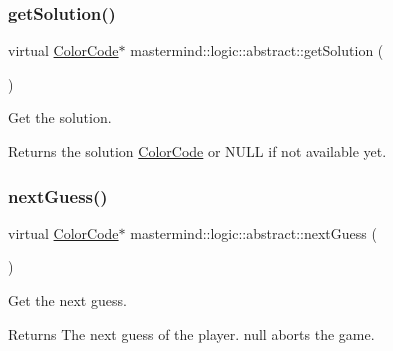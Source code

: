 \subsubsection{\texorpdfstring{get\+Solution()}{getSolution()}}
{\footnotesize\ttfamily virtual \hyperlink{classmastermind_1_1logic_1_1_color_code}{Color\+Code}$\ast$ mastermind\+::logic\+::abstract\+::get\+Solution (\begin{DoxyParamCaption}{ }\end{DoxyParamCaption})\hspace{0.3cm}{\ttfamily [pure virtual]}}



Get the solution. 

\begin{DoxyReturn}{Returns}
the solution \hyperlink{classmastermind_1_1logic_1_1_color_code}{Color\+Code} or N\+U\+LL if not available yet. 
\end{DoxyReturn}
\hypertarget{classmastermind_1_1logic_1_1abstract_ae4e30322061ea0ebc302274c79c5ca47}{}\label{classmastermind_1_1logic_1_1abstract_ae4e30322061ea0ebc302274c79c5ca47} 
\subsubsection{\texorpdfstring{next\+Guess()}{nextGuess()}}
{\footnotesize\ttfamily virtual \hyperlink{classmastermind_1_1logic_1_1_color_code}{Color\+Code}$\ast$ mastermind\+::logic\+::abstract\+::next\+Guess (\begin{DoxyParamCaption}{ }\end{DoxyParamCaption})\hspace{0.3cm}{\ttfamily [pure virtual]}}



Get the next guess. 

\begin{DoxyReturn}{Returns}
The next guess of the player. {\ttfamily null} aborts the game. 
\end{DoxyReturn}
\hypertarget{classmastermind_1_1logic_1_1abstract_ad44cfe3ef7f44a27de1522a6510ebd07}{}\label{classmastermind_1_1logic_1_1abstract_ad44cfe3ef7f44a27de1522a6510ebd07} 
